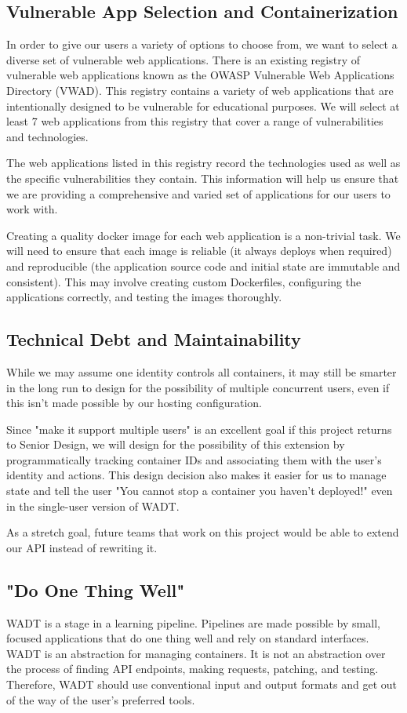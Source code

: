 \documentclass[12pt]{article}
\begin{document}
\subsection{Vulnerable App Selection and Containerization}
In order to give our users a variety of options to choose from, we want to select a diverse set of vulnerable web applications. There is an existing registry of vulnerable web applications known as the OWASP Vulnerable Web Applications Directory (VWAD). This registry contains a variety of web applications that are intentionally designed to be vulnerable for educational purposes. We will select at least 7 web applications from this registry that cover a range of vulnerabilities and technologies.

The web applications listed in this registry record the technologies used as well as the specific vulnerabilities they contain. This information will help us ensure that we are providing a comprehensive and varied set of applications for our users to work with.

Creating a quality docker image for each web application is a non-trivial task. We will need to ensure that each image is reliable (it always deploys when required) and reproducible (the application source code and initial state are immutable and consistent). This may involve creating custom Dockerfiles, configuring the applications correctly, and testing the images thoroughly.

\subsection{Technical Debt and Maintainability}
While we may assume one identity controls all containers, it may still be smarter in the long run to design for the possibility of multiple concurrent users, even if this isn't made possible by our hosting configuration.

Since "make it support multiple users" is an excellent goal if this project returns to Senior Design, we will design for the possibility of this extension by programmatically tracking container IDs and associating them with the user's identity and actions. This design decision also makes it easier for us to manage state and tell the user "You cannot stop a container you haven't deployed!" even in the single-user version of WADT.

As a stretch goal, future teams that work on this project would be able to extend our API instead of rewriting it.

\subsection{"Do One Thing Well"}
WADT is a stage in a learning pipeline. Pipelines are made possible by small, focused applications that do one thing well and rely on standard interfaces. WADT is an abstraction for managing containers. It is not an abstraction over the process of finding API endpoints, making requests, patching, and testing. Therefore, WADT should use conventional input and output formats and get out of the way of the user's preferred tools.
\end{document}
